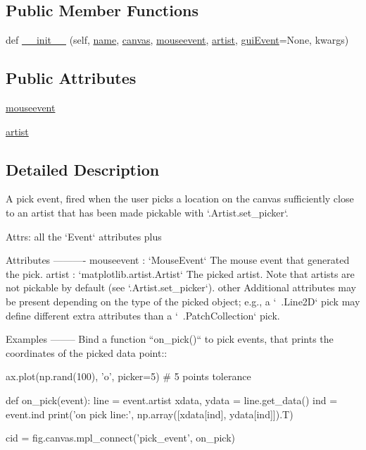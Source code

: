 \subsection*{Public Member Functions}
\begin{DoxyCompactItemize}
\item 
def \hyperlink{classmatplotlib_1_1backend__bases_1_1PickEvent_a41e924a637edce5c41b53af069010088}{\+\_\+\+\_\+init\+\_\+\+\_\+} (self, \hyperlink{classmatplotlib_1_1backend__bases_1_1Event_a4b10ea7af7c8a0b20bcdbb9ca03e1654}{name}, \hyperlink{classmatplotlib_1_1backend__bases_1_1Event_a7721d867d81a1255b1aeb51babec4e14}{canvas}, \hyperlink{classmatplotlib_1_1backend__bases_1_1PickEvent_a7e31be143b06959f137dc76492d1003a}{mouseevent}, \hyperlink{classmatplotlib_1_1backend__bases_1_1PickEvent_af977e67ad3b466ad148fbd219fc08e9a}{artist}, \hyperlink{classmatplotlib_1_1backend__bases_1_1Event_a6cc1dc3c9479b3e5f227f329037adb98}{gui\+Event}=None, kwargs)
\end{DoxyCompactItemize}
\subsection*{Public Attributes}
\begin{DoxyCompactItemize}
\item 
\hyperlink{classmatplotlib_1_1backend__bases_1_1PickEvent_a7e31be143b06959f137dc76492d1003a}{mouseevent}
\item 
\hyperlink{classmatplotlib_1_1backend__bases_1_1PickEvent_af977e67ad3b466ad148fbd219fc08e9a}{artist}
\end{DoxyCompactItemize}


\subsection{Detailed Description}
\begin{DoxyVerb}A pick event, fired when the user picks a location on the canvas
sufficiently close to an artist that has been made pickable with
`.Artist.set_picker`.

Attrs: all the `Event` attributes plus

Attributes
----------
mouseevent : `MouseEvent`
    The mouse event that generated the pick.
artist : `matplotlib.artist.Artist`
    The picked artist.  Note that artists are not pickable by default
    (see `.Artist.set_picker`).
other
    Additional attributes may be present depending on the type of the
    picked object; e.g., a `~.Line2D` pick may define different extra
    attributes than a `~.PatchCollection` pick.

Examples
--------
Bind a function ``on_pick()`` to pick events, that prints the coordinates
of the picked data point::

    ax.plot(np.rand(100), 'o', picker=5)  # 5 points tolerance

    def on_pick(event):
        line = event.artist
        xdata, ydata = line.get_data()
        ind = event.ind
        print('on pick line:', np.array([xdata[ind], ydata[ind]]).T)

    cid = fig.canvas.mpl_connect('pick_event', on_pick)
\end{DoxyVerb}
 

